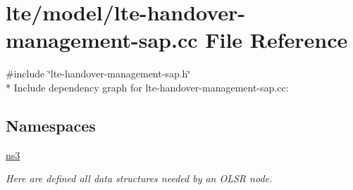 \hypertarget{lte-handover-management-sap_8cc}{}\section{lte/model/lte-\/handover-\/management-\/sap.cc File Reference}
\label{lte-handover-management-sap_8cc}
{\ttfamily \#include \char`\"{}lte-\/handover-\/management-\/sap.\+h\char`\"{}}\\*
Include dependency graph for lte-\/handover-\/management-\/sap.cc\+:
\subsection*{Namespaces}
\begin{DoxyCompactItemize}
\item 
 \hyperlink{namespacens3}{ns3}
\begin{DoxyCompactList}\small\item\em Here are defined all data structures needed by an O\+L\+SR node. \end{DoxyCompactList}\end{DoxyCompactItemize}

